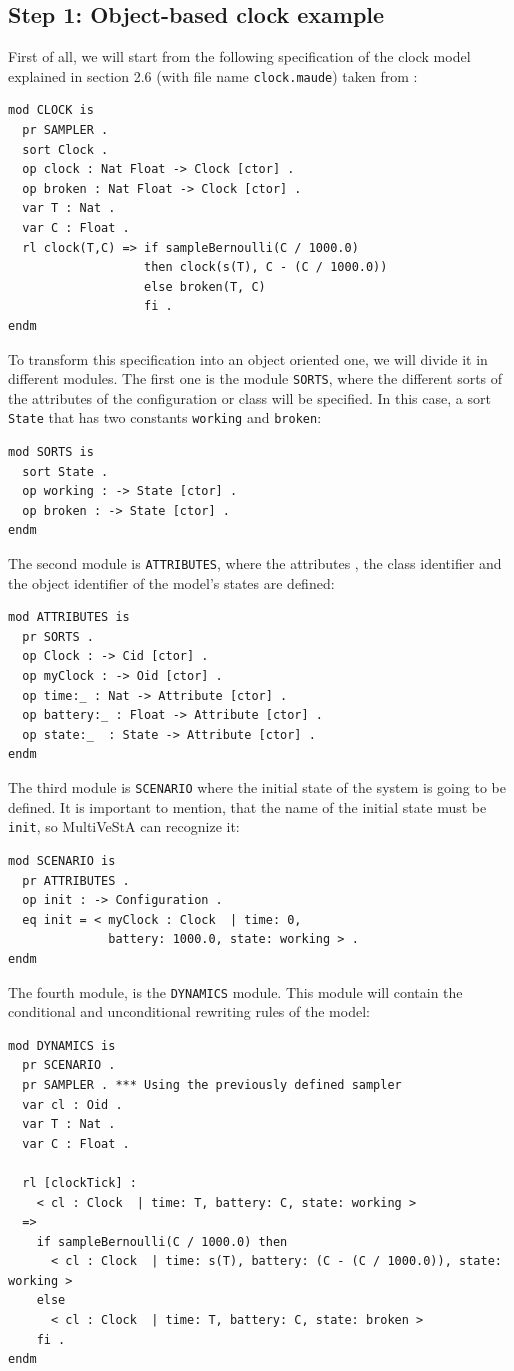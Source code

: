 \subsection{Step 1: Object-based clock example}
First of all, we will start from the following specification of the clock model explained in section 2.6 (with file name \texttt{clock.maude}) taken from \cite{MaudeManual}:
\begin{lstlisting}
mod CLOCK is 
  pr SAMPLER . 
  sort Clock . 
  op clock : Nat Float -> Clock [ctor] . 
  op broken : Nat Float -> Clock [ctor] . 
  var T : Nat . 
  var C : Float . 
  rl clock(T,C) => if sampleBernoulli(C / 1000.0) 
     			   then clock(s(T), C - (C / 1000.0)) 
                   else broken(T, C) 
                   fi . 
endm
\end{lstlisting}
To transform this specification into an object oriented one, we will divide it in different modules. The first one is the module \texttt{SORTS}, where the different sorts of the attributes of the configuration or class will be specified. In this case, a sort \texttt{State} that has two constants \texttt{working} and \texttt{broken}:
\begin{lstlisting}
mod SORTS is
  sort State .
  op working : -> State [ctor] .
  op broken : -> State [ctor] .
endm
\end{lstlisting}
The second module is \texttt{ATTRIBUTES}, where the attributes , the class identifier and the object identifier of the model's states are defined:
\begin{lstlisting}
mod ATTRIBUTES is
  pr SORTS .
  op Clock : -> Cid [ctor] .
  op myClock : -> Oid [ctor] .
  op time:_ : Nat -> Attribute [ctor] . 
  op battery:_ : Float -> Attribute [ctor] . 
  op state:_  : State -> Attribute [ctor] . 
endm
\end{lstlisting}
The third module is \texttt{SCENARIO} where the initial state of the system is going to be defined. It is important to mention, that the name of the initial state must be \texttt{init}, so MultiVeStA can recognize it:
\begin{lstlisting}
mod SCENARIO is
  pr ATTRIBUTES .
  op init : -> Configuration .
  eq init = < myClock : Clock  | time: 0, 
              battery: 1000.0, state: working > . 
endm
\end{lstlisting}
The fourth module, is the \texttt{DYNAMICS} module. This module will contain the conditional and unconditional rewriting rules of the model:
\begin{lstlisting}
mod DYNAMICS is
  pr SCENARIO .
  pr SAMPLER . *** Using the previously defined sampler
  var cl : Oid .
  var T : Nat .
  var C : Float .
  
  rl [clockTick] :
    < cl : Clock  | time: T, battery: C, state: working > 
  =>
    if sampleBernoulli(C / 1000.0) then
      < cl : Clock  | time: s(T), battery: (C - (C / 1000.0)), state: working >
    else
      < cl : Clock  | time: T, battery: C, state: broken >
    fi .
endm
\end{lstlisting}
